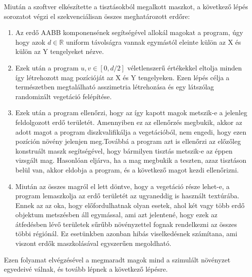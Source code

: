 Miután a szoftver elkészítette a tisztásokból megalkott maszkot, a következő lépés sorozatot végzi el szekvenciálisan összes meghatározott erdőre:
\begin{enumerate}
  \item Az erdő AABB komponensének segítségével allokál magokat a program, úgy hogy azok \begin{math}
    d \in \mathbb{R}
  \end{math} uniform távolságra vannak egymástól eleinte külön az X és külön az Y tengelyeket nézve.
  \item Ezek után a program \begin{math}
    u,v \in [0,d/2]
  \end{math} véletlenszerű értékekkel eltolja minden így létrehozott mag pozícióját az X és Y tengelyeken. Ezen lépés célja a természetben megtalálható asszimetria létrehozása és egy látszólag randomizált vegetáció felépítése.
  \item Ezek után a program ellenőrzi, hogy az így kapott magok metszik-e a jelenleg feldolgozott erdő területét. Amennyiben ez az ellenőrzés megbukik, akkor az adott magot a program diszkvalifikálja a vegetációból, nem engedi, hogy ezen pozíción növény jelenjen meg.\newline Továbbá a program azt is ellenőrzi az előzőleg konstruált maszk segítségével, hogy bármilyen tisztás metszik-e az éppen vizsgált mag. Hasonlóan eljárva, ha a mag megbukik a teszten, azaz tisztáson belül van, akkor eldobja a program, és a következő magot kezdi ellenőrizni.
  \item Miután az összes magról el lett döntve, hogy a vegetáció része lehet-e, a program lemaszkolja az erdő területét az ugyaneddig is használt textúrába. Ennek az az oka, hogy előfordulhatnak olyan esetek, ahol két vagy több erdő objektum metszésben áll egymással, ami azt jelentené, hogy ezek az átfedésben lévő területek sűrűbb növényzettel fognak rendelkezni az összes többi régiónál. Ez esetünkben azonban hibás viselkedésnek számítana, ami viszont erdők maszkolásával egyszerűen megoldható.
\end{enumerate} 

Ezen folyamat elvégzésével a megmaradt magok mind a szimulált növényzet egyedeivé válnak, és tovább lépnek a következő lépésre.

